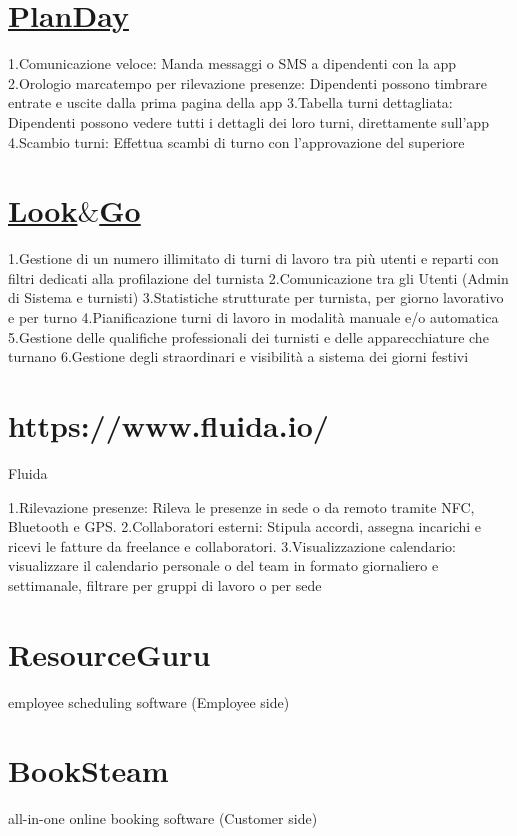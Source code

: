 \documentclass[11pt]{article}
\begin{document}
\section{\href{https://www.planday.com/it/}{PlanDay}}



	1.Comunicazione veloce: Manda messaggi o SMS a dipendenti con la app
	2.Orologio marcatempo per rilevazione presenze: Dipendenti possono timbrare entrate e uscite dalla prima pagina della app
	3.Tabella turni dettagliata: Dipendenti possono vedere tutti i dettagli dei loro turni, direttamente sull’app
	4.Scambio turni: Effettua scambi di turno con l’approvazione del superiore
	
\section{\href{https://www.lookandgo.it/}{Look$\&$Go}}
	
1.Gestione di un numero illimitato di turni di lavoro tra più utenti e reparti con filtri dedicati alla profilazione del turnista
	2.Comunicazione tra gli Utenti (Admin di Sistema e turnisti)
	3.Statistiche strutturate per turnista, per giorno lavorativo e per turno
	4.Pianificazione turni di lavoro in modalità manuale e/o automatica
	5.Gestione delle qualifiche professionali dei turnisti e delle apparecchiature che turnano
	6.Gestione degli straordinari e visibilità a sistema dei giorni festivi

\section{https://www.fluida.io/}{Fluida}

	1.Rilevazione presenze: Rileva le presenze in sede o da remoto tramite NFC, Bluetooth e GPS.
	2.Collaboratori esterni: Stipula accordi, assegna incarichi e ricevi le fatture da freelance e collaboratori.
	3.Visualizzazione calendario: visualizzare il calendario personale o del team in formato giornaliero e settimanale, filtrare per gruppi di lavoro o per sede


        \section{ResourceGuru}
        employee scheduling software          (Employee side)
        \section{BookSteam}
        all-in-one online booking software    (Customer side)
\end{document}
